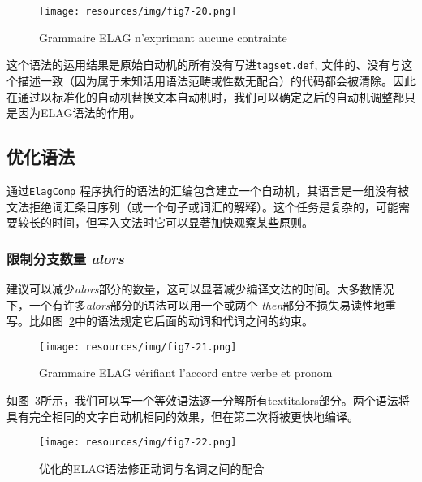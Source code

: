 \begin{figure}[!h]
\begin{center}
\texttt{[image: resources/img/fig7-20.png]}
\caption{Grammaire ELAG n’exprimant aucune contrainte\label{fig-elag-norm}}
\end{center}
\end{figure}

\bigskip
\noindent 
这个语法的运用结果是原始自动机的所有没有写进\verb$tagset.def$,
文件的、没有与这个描述一致（因为属于未知活用语法范畴或性数无配合）的代码都会被清除。因此在通过以标准化的自动机替换文本自动机时，我们可以确定之后的自动机调整都只是因为ELAG语法的作用。


\subsection{优化语法}
通过\verb+ElagComp+
程序执行的语法的汇编包含建立一个自动机，其语言是一组没有被文法拒绝词汇条目序列（或一个句子或词汇的解释）。这个任务是复杂的，可能需要较长的时间，但写入文法时它可以显著加快观察某些原则。

\subsubsection{限制分支数量 \textit{alors}}
\noindent 
建议可以减少\textit{alors}部分的数量，这可以显著减少编译文法的时间。大多数情况下，一个有许多\textit{alors}部分的语法可以用一个或两个 \textit{then}部分不损失易读性地重写。比如图~\ref{fig-NA-bad}中的语法规定它后面的动词和代词之间的约束。
\begin{figure}[!h]
\begin{center}
\texttt{[image: resources/img/fig7-21.png]}
\caption{Grammaire ELAG vérifiant l’accord entre verbe et pronom\label{fig-NA-bad}}
\end{center}
\end{figure}

\bigskip
\noindent 如图~\ref{fig-NA-good}所示，我们可以写一个等效语法逐一分解所有textit{alors}部分。两个语法将具有完全相同的文字自动机相同的效果，但在第二次将被更快地编译。

\begin{figure}[!h]
\begin{center}
\texttt{[image: resources/img/fig7-22.png]}
\caption{优化的ELAG语法修正动词与名词之间的配合\label{fig-NA-good}}
\end{center}
\end{figure}


